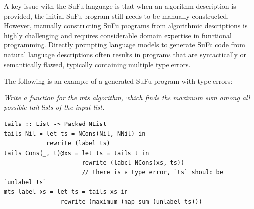 A key issue with the SuFu language is that when an algorithm description is provided, the initial SuFu program still needs to be manually constructed.
However, manually constructing SuFu programs from algorithmic descriptions is highly challenging and requires considerable domain expertise in functional programming. 
Directly prompting language models to generate SuFu code from natural language descriptions often results in programs that are syntactically or semantically flawed, typically containing multiple type errors. 

The following is an example of a generated SuFu program with type errors:
\begin{tcolorbox}[
    colback=gray!5,
    colframe=black,
    boxrule=0.5pt,
    arc=2pt,
    left=8pt,
    right=8pt,
    top=8pt,
    bottom=8pt,
    title=Natural Language Prompt
]
\textit{Write a function for the mts algorithm, which finds the maximum sum among all possible tail lists of the input list.}
\end{tcolorbox}
\begin{tcolorbox}[
    colback=gray!5,
    colframe=black,
    boxrule=0.5pt,
    arc=2pt
]
\begin{Verbatim}[fontsize=\small, xleftmargin=1em]
tails :: List -> Packed NList
tails Nil = let ts = NCons(Nil, NNil) in
            rewrite (label ts)
tails Cons(_, t)@xs = let ts = tails t in
                      rewrite (label NCons(xs, ts))
                      // there is a type error, `ts` should be `unlabel ts`
mts_label xs = let ts = tails xs in
                rewrite (maximum (map sum (unlabel ts)))
\end{Verbatim}
\end{tcolorbox}

